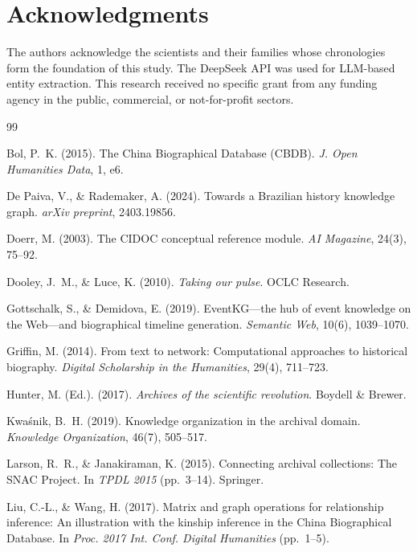 \documentclass[review]{elsarticle}
\begin{document}
\section*{Acknowledgments}

The authors acknowledge the scientists and their families whose chronologies form the foundation of this study. The DeepSeek API was used for LLM-based entity extraction. This research received no specific grant from any funding agency in the public, commercial, or not-for-profit sectors.

\begin{thebibliography}{99}

Bol, P.~K. (2015). The China Biographical Database (CBDB). \emph{J. Open Humanities Data}, 1, e6.

De Paiva, V., \& Rademaker, A. (2024). Towards a Brazilian history knowledge graph. \emph{arXiv preprint}, 2403.19856.

Doerr, M. (2003). The CIDOC conceptual reference module. \emph{AI Magazine}, 24(3), 75--92.

Dooley, J.~M., \& Luce, K. (2010). \emph{Taking our pulse}. OCLC Research.

Gottschalk, S., \& Demidova, E. (2019). EventKG---the hub of event knowledge on the Web---and biographical timeline generation. \emph{Semantic Web}, 10(6), 1039--1070.

Griffin, M. (2014). From text to network: Computational approaches to historical biography. \emph{Digital Scholarship in the Humanities}, 29(4), 711--723.

Hunter, M. (Ed.). (2017). \emph{Archives of the scientific revolution}. Boydell \& Brewer.

Kwa\'{s}nik, B.~H. (2019). Knowledge organization in the archival domain. \emph{Knowledge Organization}, 46(7), 505--517.

Larson, R.~R., \& Janakiraman, K. (2015). Connecting archival collections: The SNAC Project. In \emph{TPDL 2015} (pp.~3--14). Springer.

Liu, C.-L., \& Wang, H. (2017). Matrix and graph operations for relationship inference: An illustration with the kinship inference in the China Biographical Database. In \emph{Proc. 2017 Int. Conf. Digital Humanities} (pp.~1--5).


\end{thebibliography}
\end{document}
